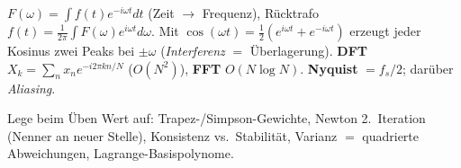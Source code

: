 \documentclass[a4paper,11pt]{article}
\begin{document}
\begin{formel}
$F(\omega)=\int f(t)e^{-i\omega t}dt$ (Zeit $\to$ Frequenz), Rücktrafo
$f(t)=\tfrac1{2\pi}\int F(\omega)e^{i\omega t}d\omega$. Mit $\cos(\omega t)=\tfrac12(e^{i\omega t}+e^{-i\omega t})$
erzeugt jeder Kosinus zwei Peaks bei $\pm\omega$ (\emph{Interferenz} $=$ Überlagerung). \textbf{DFT}
$X_k=\sum_n x_n e^{-i2\pi kn/N}$ ($O(N^2)$), \textbf{FFT} $O(N\log N)$. \textbf{Nyquist} $=f_s/2$;
darüber \emph{Aliasing}.
\end{formel}

\vfill
\begin{center}\small\color{muted}
Lege beim Üben Wert auf: Trapez-/Simpson-Gewichte, Newton 2.\ Iteration (Nenner an neuer Stelle),
Konsistenz vs.\ Stabilität, Varianz $=$ quadrierte Abweichungen, Lagrange-Basispolynome.
\end{center}
\end{document}

